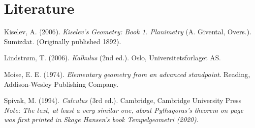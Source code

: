 



\chapter*{Literature}
Kiselev, A. (2006). \textit{Kiselev's Geometry: Book 1. Planimetry} (A. Givental, Overs.). Sumizdat. (Originally published 1892).\vsk

Lindstrøm, T. (2006). \textit{Kalkulus} (2nd ed.). Oslo, Universitetsforlaget AS.\vsk

Moise, E. E. (1974). \textit{Elementary geometry from an advanced standpoint}. Reading, Addison-Wesley Publishing Company.\vsk

Spivak, M. (1994). \textit{Calculus} (3rd ed.). Cambridge, Cambridge University Press
\vfill
\textit{\footnotesize Note: The text, at least a very similar one, about Pythagoras's theorem on page \pageref{pytforklaringintro} was first printed in Skage Hansen's book \textit{Tempelgeometri} (2020).}
\newpage
